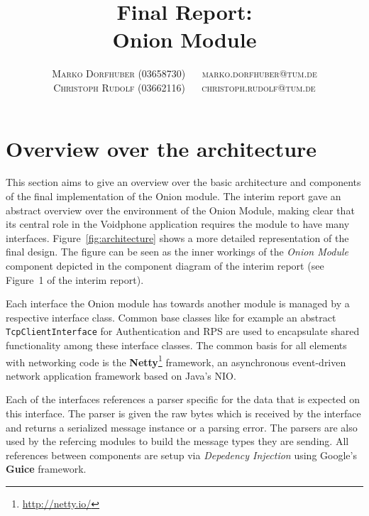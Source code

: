 \documentclass[paper=letter, fontsize=12pt]{article}
\title{\vspace{-15mm}\fontsize{24pt}{10pt}\selectfont\textbf{Final Report: \\Onion Module}} %
\author{
\large
{\textsc{Marko Dorfhuber (03658730) $\quad$ \Letter marko.dorfhuber@tum.de}}\\[2mm]
{\textsc{Christoph Rudolf (03662116) $\quad$ \Letter christoph.rudolf@tum.de}}\\[2mm]
}
\date{}
\begin{document}
\maketitle %
\thispagestyle{fancy} %

\section{Overview over the architecture}
This section aims to give an overview over the basic architecture and components of the final implementation of the Onion module.
The interim report gave an abstract overview over the environment of the Onion Module, making clear that its central role in the Voidphone application requires the module to have many interfaces. Figure~\ref{fig:architecture} shows a more detailed representation of the final design. The figure can be seen as the inner workings of the \emph{Onion Module} component depicted in the component diagram of the interim report (see Figure~1 of the interim report). 

Each interface the Onion module has towards another module is managed by a respective interface class. Common base classes like for example an abstract \texttt{TcpClientInterface} for Authentication and RPS are used to encapsulate shared functionality among these interface classes. The common basis for all elements with networking code is the \textbf{Netty}\footnote{\url{http://netty.io/}} framework, an asynchronous event-driven network application framework based on Java's NIO. 

Each of the interfaces references a parser specific for the data that is expected on this interface. The parser is given the raw bytes which is received by the interface and returns a serialized message instance or a parsing error. The parsers are also used by the refercing modules to build the message types they are sending. All references between components are setup via \emph{Depedency Injection} using Google's \textbf{Guice} framework.
\end{document}
